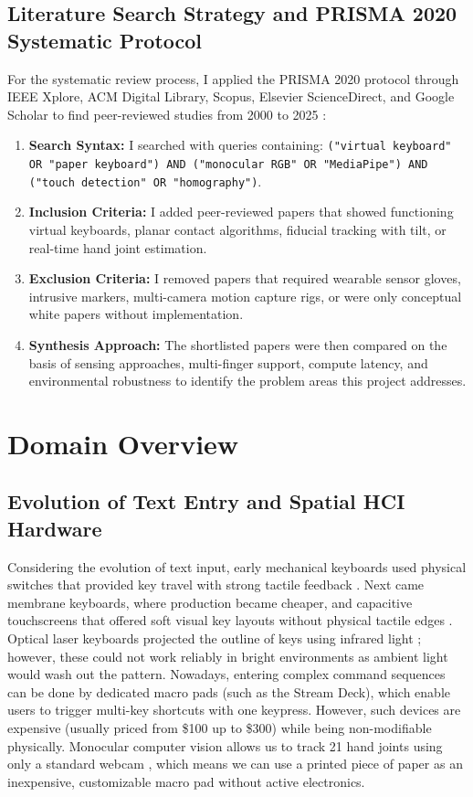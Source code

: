 \subsection{Literature Search Strategy and PRISMA 2020 Systematic Protocol}
\label{subsec:lit_search_strategy}
For the systematic review process, I applied the PRISMA 2020 protocol through IEEE Xplore, ACM Digital Library, Scopus, Elsevier ScienceDirect, and Google Scholar to find peer-reviewed studies from 2000 to 2025 \cite{ReviewVirtualKeyboard2020}:
\begin{enumerate}
    \item \textbf{Search Syntax:} I searched with queries containing: \texttt{("virtual keyboard" OR "paper keyboard") AND ("monocular RGB" OR "MediaPipe") AND ("touch detection" OR "homography")}.
    \item \textbf{Inclusion Criteria:} I added peer-reviewed papers that showed functioning virtual keyboards, planar contact algorithms, fiducial tracking with tilt, or real-time hand joint estimation.
    \item \textbf{Exclusion Criteria:} I removed papers that required wearable sensor gloves, intrusive markers, multi-camera motion capture rigs, or were only conceptual white papers without implementation.
    \item \textbf{Synthesis Approach:} The shortlisted papers were then compared on the basis of sensing approaches, multi-finger support, compute latency, and environmental robustness to identify the problem areas this project addresses.
\end{enumerate}

\section{Domain Overview}
\label{sec:lit_domain_overview}

\subsection{Evolution of Text Entry and Spatial HCI Hardware}
\label{subsec:lit_history_evolution}
Considering the evolution of text input, early mechanical keyboards used physical switches that provided key travel with strong tactile feedback \cite{ReviewVirtualKeyboard2020}. Next came membrane keyboards, where production became cheaper, and capacitive touchscreens that offered soft visual key layouts without physical tactile edges \cite{ReviewVirtualKeyboard2020}. Optical laser keyboards projected the outline of keys using infrared light \cite{Cheng2015Fingertip, Kudale2016RealTime}; however, these could not work reliably in bright environments as ambient light would wash out the pattern. Nowadays, entering complex command sequences can be done by dedicated macro pads (such as the Stream Deck), which enable users to trigger multi-key shortcuts with one keypress. However, such devices are expensive (usually priced from \$100 up to \$300) while being non-modifiable physically. Monocular computer vision allows us to track 21 hand joints using only a standard webcam \cite{Zhang2020MediaPipe, GilMartin2023Hand}, which means we can use a printed piece of paper as an inexpensive, customizable macro pad without active electronics.


